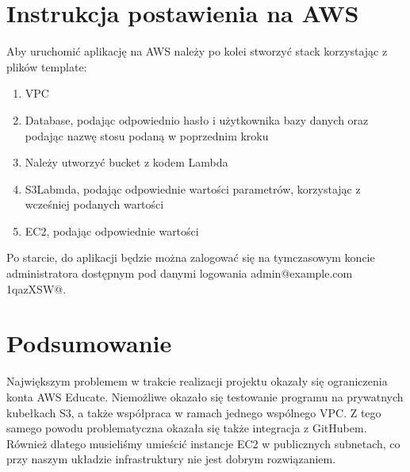 \documentclass[12pt,a4paper]{article}
\begin{document}
    \section{Instrukcja postawienia na AWS}
        Aby uruchomić aplikację na AWS należy po kolei stworzyć stack korzystając z plików template:
        \begin{enumerate}
            \item VPC
            \item Database, podając odpowiednio hasło i użytkownika bazy danych oraz podając nazwę stosu podaną w poprzednim kroku
            \item Należy utworzyć bucket z kodem Lambda
            \item S3Labmda, podając odpowiednie wartości parametrów, korzystając z wcześniej podanych wartości
            \item EC2, podając odpowiednie wartości
        \end{enumerate}
        Po starcie, do aplikacji będzie można zalogować się na tymczasowym koncie administratora dostępnym pod danymi logowania admin@example.com 1qazXSW@.
    \section{Podsumowanie}
        Największym problemem w trakcie realizacji projektu okazały się ograniczenia konta AWS Educate.
        Niemożliwe okazało się testowanie programu na prywatnych kubełkach S3, a także współpraca w ramach jednego wspólnego VPC.
        Z tego samego powodu problematyczna okazała się także integracja z GitHubem.
        Również dlatego musieliśmy umieścić instancje EC2 w publicznych subnetach, co przy naszym układzie infrastruktury nie jest dobrym rozwiązaniem.
\end{document}
